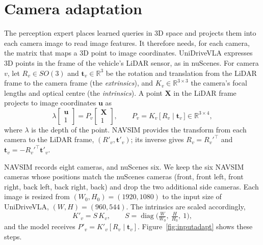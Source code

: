 \documentclass[11pt, a4paper, oneside]{book}
\begin{document}
\section{Camera adaptation}
\label{sec:geometry}
The perception expert places learned queries in 3D space and projects them into each camera
image to read image features. It therefore needs, for each camera, the matrix that maps a 3D
point to image coordinates. UniDriveVLA expresses 3D points in the frame of the vehicle's LiDAR
sensor, as in nuScenes. For camera $v$, let $R_v\in SO(3)$ and $\mathbf{t}_v\in\mathbb{R}^3$
be the rotation and translation from the LiDAR frame to the camera frame (the
\emph{extrinsics}), and $K_v\in\mathbb{R}^{3\times3}$ the camera's focal lengths and optical
centre (the \emph{intrinsics}). A point $\mathbf{X}$ in the LiDAR frame projects to image
coordinates $\mathbf{u}$ as
\begin{equation}
  \lambda\begin{bmatrix}\mathbf{u}\\1\end{bmatrix}
  = P_v\begin{bmatrix}\mathbf{X}\\1\end{bmatrix},\qquad
  P_v=K_v\,\big[\,R_v\mid\mathbf{t}_v\,\big]\in\mathbb{R}^{3\times4},
\end{equation}
where $\lambda$ is the depth of the point. NAVSIM provides the transform from each camera to
the LiDAR frame, $(R'_v,\mathbf{t}'_v)$; its inverse gives $R_v=R_v'^{\top}$ and
$\mathbf{t}_v=-R_v'^{\top}\mathbf{t}'_v$.

NAVSIM records eight cameras, and nuScenes six. We keep the six NAVSIM cameras whose positions
match the nuScenes cameras (front, front left, front right, back left, back right, back) and
drop the two additional side cameras. Each image is resized from
$(W_0,H_0)=(1920,1080)$ to the input size of UniDriveVLA, $(W,H)=(960,544)$. The intrinsics
are scaled accordingly,
\begin{equation}
  K'_v=S\,K_v,\qquad S=\operatorname{diag}\!\Big(\tfrac{W}{W_0},\ \tfrac{H}{H_0},\ 1\Big),
\end{equation}
and the model receives $P'_v=K'_v[R_v\mid\mathbf{t}_v]$. Figure~\ref{fig:inputadapt} shows these
steps.
\end{document}
